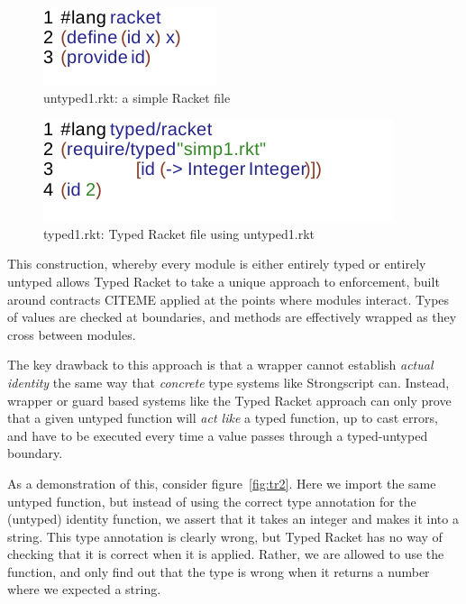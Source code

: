 \documentclass[preprint]{sigplanconf}
\newcommand{\xt}[1]{{\sf{#1}}\xspace}
\begin{document}
\begin{figure}[h]
\includegraphics{untyped-rkt1.pdf}
\caption{untyped1.rkt: a simple Racket file}
\label{fig:ut1r}
\end{figure}

\begin{figure}
\includegraphics{typed-rkt1.pdf}
\caption{typed1.rkt: Typed Racket file using untyped1.rkt}
\label{fig:t1r}
\end{figure}

This construction, whereby every module is either entirely typed or entirely untyped
allows Typed Racket to take a unique approach to enforcement, built around
contracts CITEME applied at the points where modules interact. Types of values are
checked at boundaries, and methods are effectively wrapped as they cross between modules.

The key drawback to this approach is that a wrapper cannot establish \emph{actual
identity} the same way that \emph{concrete} type systems like Strongscript can. Instead, wrapper
or guard based systems like the Typed Racket approach can only prove that a given untyped
function will \emph{act like} a typed function, up to cast errors, and have to be
executed every time a value passes through a typed-untyped boundary.

As a demonstration of this, consider figure~\ref{fig:tr2}. Here we import the same
untyped function, but instead of using the correct type annotation for the (untyped)
identity function, we assert that it takes an integer and makes it into a string. This
type annotation is clearly wrong, but Typed Racket has no way of checking that it is 
correct when it is applied. Rather, we are allowed to use the \xt{id} function, and only
find out that the type is wrong when it returns a number where we expected a string.
\end{document}
